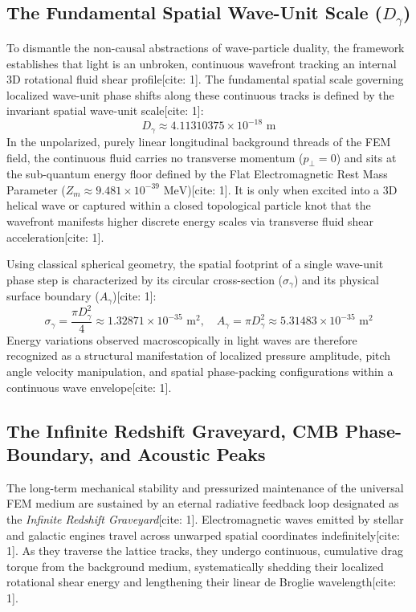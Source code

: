 \documentclass[11pt,a4paper]{article}
\begin{document}
	\subsection{\texorpdfstring{The Fundamental Spatial Wave-Unit Scale ($D_\gamma$)}{The Fundamental Spatial Wave-Unit Scale (D\_gamma)}}
	To dismantle the non-causal abstractions of wave-particle duality, the framework establishes that light is an unbroken, continuous wavefront tracking an internal 3D rotational fluid shear profile[cite: 1]. The fundamental spatial scale governing localized wave-unit phase shifts along these continuous tracks is defined by the invariant spatial wave-unit scale[cite: 1]:
	\begin{equation}
		D_\gamma \approx 4.11310375 \times 10^{-18}\text{ m}
	\end{equation}
	In the unpolarized, purely linear longitudinal background threads of the FEM field, the continuous fluid carries no transverse momentum ($p_\perp = 0$) and sits at the sub-quantum energy floor defined by the Flat Electromagnetic Rest Mass Parameter ($Z_m \approx 9.481 \times 10^{-39}\text{ MeV}$)[cite: 1]. It is only when excited into a 3D helical wave or captured within a closed topological particle knot that the wavefront manifests higher discrete energy scales via transverse fluid shear acceleration[cite: 1].
	
	Using classical spherical geometry, the spatial footprint of a single wave-unit phase step is characterized by its circular cross-section ($\sigma_{\gamma}$) and its physical surface boundary ($A_{\gamma}$)[cite: 1]:
	\begin{equation}
		\sigma_{\gamma} = \frac{\pi D_{\gamma}^2}{4} \approx 1.32871 \times 10^{-35} \text{ m}^2, \quad A_{\gamma} = \pi D_{\gamma}^2 \approx 5.31483 \times 10^{-35} \text{ m}^2
	\end{equation}
	Energy variations observed macroscopically in light waves are therefore recognized as a structural manifestation of localized pressure amplitude, pitch angle velocity manipulation, and spatial phase-packing configurations within a continuous wave envelope[cite: 1].
	
	\subsection{The Infinite Redshift Graveyard, CMB Phase-Boundary, and Acoustic Peaks}
	The long-term mechanical stability and pressurized maintenance of the universal FEM medium are sustained by an eternal radiative feedback loop designated as the \textit{Infinite Redshift Graveyard}[cite: 1]. Electromagnetic waves emitted by stellar and galactic engines travel across unwarped spatial coordinates indefinitely[cite: 1]. As they traverse the lattice tracks, they undergo continuous, cumulative drag torque from the background medium, systematically shedding their localized rotational shear energy and lengthening their linear de Broglie wavelength[cite: 1].
	
\end{document}
